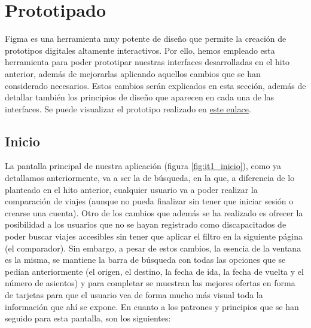 \section{Prototipado}

Figma es una herramienta muy potente de diseño que permite la creación de prototipos
digitales altamente interactivos. Por ello, hemos empleado esta herramienta para poder
prototipar nuestras interfaces desarrolladas en el hito anterior, además de mejorarlas
aplicando aquellos cambios que se han considerado necesarios. Estos cambios serán explicados
en esta sección, además de detallar también los principios de diseño que aparecen en cada
una de las interfaces. Se puede visualizar el prototipo realizado en \href{https://www.figma.com/file/YGz2UUMhvxNOTCHhu1TZle/Just-Travel-It?type=design&node-id=0%3A1&mode=design&t=18R6j8wE0vfjz3qF-1}{este enlace}.

\subsection{Inicio}

La pantalla principal de nuestra aplicación (figura \ref{fig:it1_inicio}), como ya detallamos anteriormente, va a ser la de búsqueda,
en la que, a diferencia de lo planteado en el hito anterior, cualquier usuario va a poder realizar la
comparación de viajes (aunque no pueda finalizar sin tener que iniciar sesión o crearse una cuenta). Otro
de los cambios que además se ha realizado es ofrecer la posibilidad a los usuarios que no se hayan registrado
como discapacitados de poder buscar viajes accesibles sin tener que aplicar el filtro en la siguiente página
(el comparador). Sin embargo, a pesar de estos cambios, la esencia de la ventana es la misma, se mantiene la
barra de búsqueda con todas las opciones que se pedían anteriormente (el origen, el destino, la fecha de ida,
la fecha de vuelta y el número de asientos) y para completar se muestran las mejores ofertas en forma de
tarjetas para que el usuario vea de forma mucho más visual toda la información que ahí se expone. En cuanto a
los patrones y principios que se han seguido para esta pantalla, son los siguientes:

